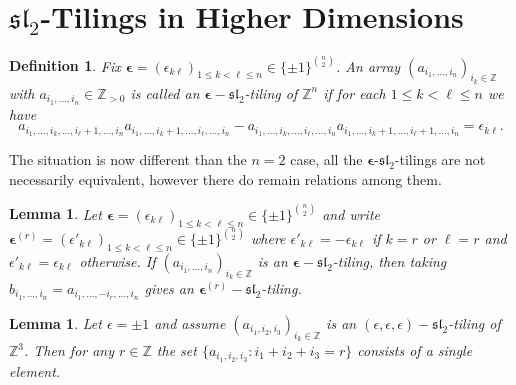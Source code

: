 \documentclass{amsart}
\newtheorem{definition}[theorem]{Definition}
\newtheorem{lemma}[theorem]{Lemma}
\newcommand{\bepsilon}{\boldsymbol{\epsilon}}
\newcommand{\fsl}{\mathfrak{sl}}
\newcommand{\ZZ}{\mathbb{Z}}
\begin{document}
  \section{$\fsl_2$-Tilings in Higher Dimensions}
    \begin{definition}
      Fix $\bepsilon=(\epsilon_{k\ell})_{1\le k<\ell\le n}\in\{\pm1\}^{{n\choose 2}}$.  An array $(a_{i_1,\ldots,i_n})_{i_k\in\ZZ}$ with $a_{i_1,\ldots,i_n}\in\ZZ_{>0}$ is called an \emph{$\bepsilon-\fsl_2$-tiling of $\ZZ^n$} if for each $1\le k<\ell\le n$ we have
      \begin{equation}\label{eq:higher sl2 recursion}
        a_{i_1,\ldots,i_k,\ldots,i_\ell+1,\ldots,i_n}a_{i_1,\ldots,i_k+1,\ldots,i_\ell,\ldots,i_n}-a_{i_1,\ldots,i_k,\ldots,i_\ell,\ldots,i_n}a_{i_1,\ldots,i_k+1,\ldots,i_\ell+1,\ldots,i_n}=\epsilon_{k\ell}.
      \end{equation}
    \end{definition}
    The situation is now different than the $n=2$ case, all the $\bepsilon$-$\fsl_2$-tilings are not necessarily equivalent, however there do remain relations among them.
    \begin{lemma}
      Let $\bepsilon=(\epsilon_{k\ell})_{1\le k<\ell\le n}\in\{\pm1\}^{{n\choose 2}}$ and write $\bepsilon^{(r)}=(\epsilon'_{k\ell})_{1\le k<\ell\le n}\in\{\pm1\}^{{n\choose 2}}$ where $\epsilon'_{k\ell}=-\epsilon_{k\ell}$ if $k=r$ or $\ell=r$ and $\epsilon'_{k\ell}=\epsilon_{k\ell}$ otherwise.  If $(a_{i_1,\ldots,i_n})_{i_k\in\ZZ}$ is an $\bepsilon-\fsl_2$-tiling, then taking $b_{i_1,\ldots,i_n}=a_{i_1,\ldots,-i_r,\ldots,i_n}$ gives an $\bepsilon^{(r)}-\fsl_2$-tiling.
    \end{lemma}
    \begin{lemma}\label{le:constant slices}
      Let $\epsilon=\pm1$ and assume $(a_{i_1,i_2,i_3})_{i_k\in\ZZ}$ is an $(\epsilon,\epsilon,\epsilon)-\fsl_2$-tiling of $\ZZ^3$.  Then for any $r\in\ZZ$ the set $\{a_{i_1,i_2,i_3}:i_1+i_2+i_3=r\}$ consists of a single element.
    \end{lemma}
\end{document}
